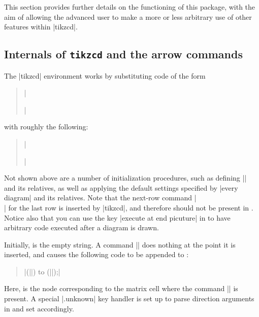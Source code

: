 \documentclass[a4paper]{ltxdoc}
\begin{document}
This section provides further details on the functioning of this
package, with the aim of allowing the advanced user to make a more or
less arbitrary use of other \tikzname{} features within |{tikzcd}|.

\subsection{Internals of \texttt{tikzcd} and the arrow commands}
\label{sec:intern-arrow-comm}

The |{tikzcd}| environment works by substituting code of the form
\begin{quote}
  ||
\end{quote}
with roughly the following:
\begin{quote}
  ||
\end{quote}

Not shown above are a number of initialization procedures, such as
defining |\arrow| and its relatives, as well as applying the default
settings specified by |every diagram| and its relatives.  Note that
the next-row command |\\| for the last row is inserted by |{tikzcd}|,
and therefore should not be present in .  Notice also
that you can use the key |execute at end picuture| in 
to have arbitrary \tikzname{} code executed after a diagram is drawn.

Initially,  is the empty string.  A command
|| does nothing at the point it is inserted,
and causes the following code to be appended to :
\begin{quote}
  | (||) to (||);|
\end{quote}
Here,  is the node corresponding to the matrix cell
where the command |\arrow| is present.  A special |.unknown| key
handler is set up to parse direction arguments in  and
set  accordingly.
\end{document}
